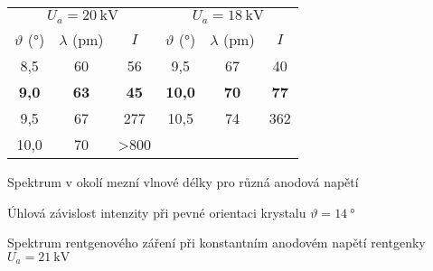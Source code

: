 \begin{tabulka}[p]
\centering
\begin{tabular}{ccc|ccc}
\multicolumn{3}{c|}{$U_a = \SI{20}{\kV}$} & \multicolumn{3}{c}{$U_a = \SI{18}{\kV}$} \\
$\vartheta$ (\si{\degree}) & $\lambda$ (\si{\pico\metre}) & $I$ & $\vartheta$ (\si{\degree}) & $\lambda$ (\si{\pico\metre}) & $I$   \\ \hline
8,5 & 60 & 56 & 9,5 & 67 & 40 \\ 
\textbf{9,0} & \textbf{63} & \textbf{45} & \textbf{10,0} & \textbf{70} & \textbf{77} \\ 
9,5 & 67 & 277 & 10,5 & 74 & 362 \\ 
10,0 & 70 & \textgreater 800 &  &  &  \\ 
\end{tabular}
\caption{Spektrum v okolí mezní vlnové délky pro různá anodová napětí}
\label{t:mezni}
\end{tabulka}


\begin{graph}[p] 
\centering

\caption{Úhlová závislost intenzity při pevné orientaci krystalu $\vartheta=\SI{14}{\degree}$}
\label{g:uhel}
\end{graph}


\begin{graph}[p] 
\centering

\caption{Spektrum rentgenového záření při konstantním anodovém napětí rentgenky $U_a=\SI{21}{\kV}$}
\label{g:spektrum}
\end{graph}